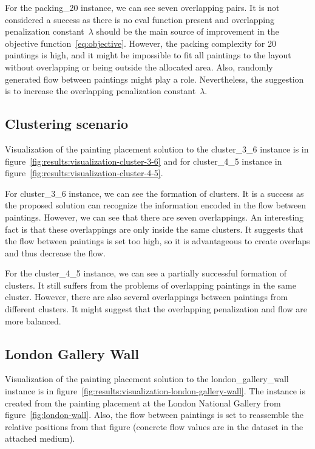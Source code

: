 For the packing\_20 instance, we can see seven overlapping pairs.
It is not considered a success as there is no eval function present and overlapping penalization constant~$\lambda$
should be the main source of improvement in the objective function~\ref{eq:objective}.
However, the packing complexity for 20 paintings is high, and it might be impossible to fit all paintings to the layout without overlapping or being outside the allocated area.
Also, randomly generated flow between paintings might play a role.
Nevertheless, the suggestion is to increase the overlapping penalization constant~$\lambda$.

\subsection{Clustering scenario}\label{subsec:clustering-scenario}

Visualization of the painting placement solution to the cluster\_3\_6 instance
is in figure~\ref{fig:results:visualization-cluster-3-6}
and for cluster\_4\_5 instance in figure~\ref{fig:results:visualization-cluster-4-5}.

For cluster\_3\_6 instance, we can see the formation of clusters.
It is a success as the proposed solution can recognize
the information encoded in the flow between paintings.
However, we can see that there are seven overlappings.
An interesting fact is that these overlappings are only inside the same clusters.
It suggests that the flow between paintings is set too high,
so it is advantageous to create overlaps and thus decrease the flow.

For the cluster\_4\_5 instance, we can see a partially successful formation of clusters.
It still suffers from the problems of overlapping paintings in the same cluster.
However, there are also several overlappings between paintings from different clusters.
It might suggest that the overlapping penalization and flow are more balanced.

\subsection{London Gallery Wall}\label{subsec:london-gallery-wall}

Visualization of the painting placement solution to the london\_gallery\_wall instance
is in figure~\ref{fig:results:visualization-london-gallery-wall}.
The instance is created from the painting placement at the London National Gallery from figure~\ref{fig:london-wall}.
Also, the flow between paintings is set to reassemble the relative positions from that figure
(concrete flow values are in the dataset in the attached medium).

